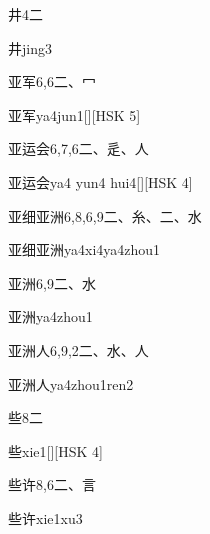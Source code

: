 \begin{entry}{井}{4}{⼆}
  \begin{phonetics}{井}{jing3}
  \end{phonetics}
\end{entry}

\begin{entry}{亚军}{6,6}{⼆、⼍}
  \begin{phonetics}{亚军}{ya4jun1}[][HSK 5]
  \end{phonetics}
\end{entry}

\begin{entry}{亚运会}{6,7,6}{⼆、⾡、⼈}
  \begin{phonetics}{亚运会}{ya4 yun4 hui4}[][HSK 4]
  \end{phonetics}
\end{entry}

\begin{entry}{亚细亚洲}{6,8,6,9}{⼆、⽷、⼆、⽔}
  \begin{phonetics}{亚细亚洲}{ya4xi4ya4zhou1}
  \end{phonetics}
\end{entry}

\begin{entry}{亚洲}{6,9}{⼆、⽔}
  \begin{phonetics}{亚洲}{ya4zhou1}
  \end{phonetics}
\end{entry}

\begin{entry}{亚洲人}{6,9,2}{⼆、⽔、⼈}
  \begin{phonetics}{亚洲人}{ya4zhou1ren2}
  \end{phonetics}
\end{entry}

\begin{entry}{些}{8}{⼆}
  \begin{phonetics}{些}{xie1}[][HSK 4]
  \end{phonetics}
\end{entry}

\begin{entry}{些许}{8,6}{⼆、⾔}
  \begin{phonetics}{些许}{xie1xu3}
  \end{phonetics}
\end{entry}


